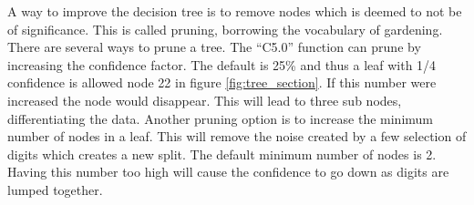 A way to improve the decision tree is to remove nodes which is deemed to not be of significance.
This is called pruning, borrowing the vocabulary of gardening.
There are several ways to prune a tree.
The ``C5.0'' function can prune by increasing the confidence factor. 
The default is 25\% and thus a leaf with 1/4 confidence is allowed node 22 in figure \ref{fig:tree_section}.
If this number were increased the node would disappear.
This will lead to three sub nodes, differentiating the data.
Another pruning option is to increase the minimum number of nodes in a leaf. 
This will remove the noise created by a few selection of digits which creates a new split.
The default minimum number of nodes is 2.
Having this number too high will cause the confidence to go down as digits are lumped together. 